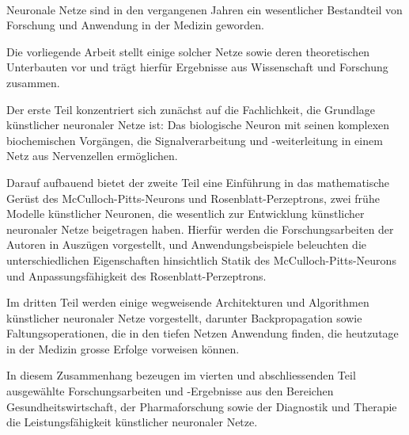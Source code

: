 \kurzfassung

\paragraph*{}

Neuronale Netze sind in den vergangenen Jahren ein wesentlicher Bestandteil von Forschung und Anwendung in der Medizin geworden.

Die vorliegende Arbeit stellt einige solcher Netze sowie deren theoretischen Unterbauten vor und trägt hierfür Ergebnisse aus Wissenschaft und Forschung zusammen.

Der erste Teil konzentriert sich zunächst auf die Fachlichkeit, die Grundlage künstlicher neuronaler Netze ist: Das biologische Neuron mit seinen komplexen biochemischen Vorgängen, die Signalverarbeitung und -weiterleitung in einem Netz aus Nervenzellen ermöglichen.

Darauf aufbauend bietet der zweite Teil eine Einführung in das mathematische Gerüst des McCulloch-Pitts-Neurons und Rosenblatt-Perzeptrons, zwei frühe Modelle künstlicher Neuronen, die wesentlich zur Entwicklung künstlicher neuronaler Netze beigetragen haben.
Hierfür werden die Forschungsarbeiten der Autoren in Auszügen vorgestellt, und Anwendungsbeispiele beleuchten die unterschiedlichen Eigenschaften hinsichtlich Statik des McCulloch-Pitts-Neurons und Anpassungsfähigkeit des Rosenblatt-Perzeptrons.

Im dritten Teil werden einige wegweisende Architekturen und Algorithmen künstlicher neuronaler Netze vorgestellt, darunter Backpropagation sowie Faltungsoperationen, die in den tiefen Netzen Anwendung finden, die heutzutage in der Medizin grosse Erfolge vorweisen können.

In diesem Zusammenhang bezeugen im vierten und abschliessenden Teil ausgewählte Forschungsarbeiten und -Ergebnisse aus den Bereichen Gesundheitswirtschaft, der Pharmaforschung sowie der Diagnostik und Therapie die Leistungsfähigkeit künstlicher neuronaler Netze.
